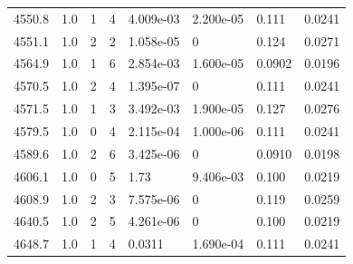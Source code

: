 \documentclass[preview]{standalone}
\begin{document}
{{{{{{{{{{{\begin{tabular}{L{1.2cm}C{1.2cm} C{0.3cm}C{0.5cm} C{1.4cm}C{1.4cm} C{1.4cm}C{1.4cm}}
  4550.8  &   1.0  & 1     &  4 &  4.009e-03  & 2.200e-05  & 0.111 &  0.0241   \\ 
  4551.1  &   1.0  & 2     &  2 &  1.058e-05  & 0  & 0.124 &  0.0271   \\ 
  4564.9  &   1.0  & 1     &  6 &  2.854e-03  & 1.600e-05  & 0.0902 &  0.0196   \\ 
  4570.5  &   1.0  & 2     &  4 &  1.395e-07  & 0  & 0.111 &  0.0241   \\ 
  4571.5  &   1.0  & 1     &  3 &  3.492e-03  & 1.900e-05  & 0.127 &  0.0276   \\ 
  4579.5  &   1.0  & 0     &  4 &  2.115e-04  & 1.000e-06  & 0.111 &  0.0241   \\ 
  4589.6  &   1.0  & 2     &  6 &  3.425e-06  & 0  & 0.0910 &  0.0198   \\ 
  4606.1  &   1.0  & 0     &  5 &  1.73  & 9.406e-03  & 0.100 &  0.0219   \\ 
  4608.9  &   1.0  & 2     &  3 &  7.575e-06  & 0  & 0.119 &  0.0259   \\ 
  4640.5  &   1.0  & 2     &  5 &  4.261e-06  & 0  & 0.100 &  0.0219   \\ 
  4648.7  &   1.0  & 1     &  4 &  0.0311  & 1.690e-04  & 0.111 &  0.0241   \\ 
\hline 
\end{tabular} 

}}}}}}}}}}}
\end{document}
